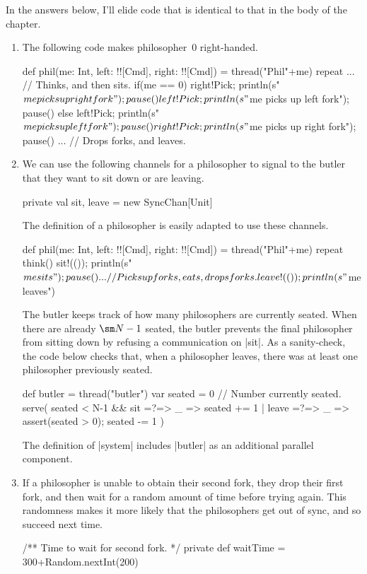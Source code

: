 \begin{answerI}
In the answers below, I'll elide code that is identical to that in the body of
the chapter.

\begin{enumerate}
\item
The following code makes philosopher~$0$ right-handed.
%
\begin{scala}
  def phil(me: Int, left: !![Cmd], right: !![Cmd]) = thread("Phil"+me){
    repeat{
      ... // Thinks, and then sits.
      if(me == 0){
        right!Pick; println(s"$me picks up right fork"); pause()
        left!Pick; println(s"$me picks up left fork"); pause()
      }
      else{
        left!Pick; println(s"$me picks up left fork"); pause()
        right!Pick; println(s"$me picks up right fork"); pause()
      }
      ... // Drops forks, and leaves.
    }
  }
\end{scala}


\item We can use the following channels for a philosopher to signal to the
  butler that they want to sit down or are leaving.
\begin{scala}
  private val sit, leave = new SyncChan[Unit]
\end{scala}
%
The definition of a philosopher is easily adapted to use these channels.%
\begin{scala}
  def phil(me: Int, left: !![Cmd], right: !![Cmd]) = thread("Phil"+me){
    repeat{
      think()
      sit!(()); println(s"$me sits"); pause()
      ... // Picks up forks, eats, drops forks.
      leave!(()); println(s"$me leaves")
    }
  }
\end{scala}
%
The butler keeps track of how many philosophers are currently seated.  When
there are already $\sm N - 1$ seated, the butler prevents the final
philosopher from sitting down by refusing a communication on |sit|.  As a
sanity-check, the code below checks that, when a philosopher leaves, there was
at least one philosopher previously seated.
%
\begin{scala}
   def butler = thread("butler"){
    var seated = 0 // Number currently seated.
    serve(
      seated < N-1 && sit =?=> { _ => seated += 1 }
      | leave =?=> { _ => assert(seated > 0); seated -= 1 }
    )
  }
\end{scala}
%
The definition of |system| includes |butler| as an additional parallel
component. 


\item
If a philosopher is unable to obtain their second fork, they drop their first
fork, and then wait for a random amount of time before trying again.  This
randomness makes it more likely that the philosophers get out of sync, and so
succeed next time.  
%
\begin{scala}
  /** Time to wait for second fork. */
  private def waitTime = 300+Random.nextInt(200)


\end{scala}
\end{enumerate}
\end{answerI}
